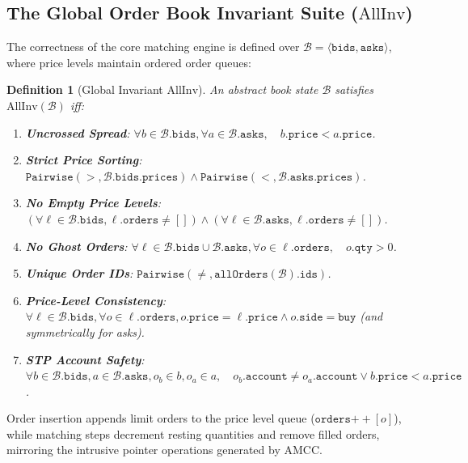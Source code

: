 \documentclass[11pt,a4paper]{article}
\newtheorem{definition}{Definition}
\begin{document}
\subsection{The Global Order Book Invariant Suite \texorpdfstring{($\mathrm{AllInv}$)}{(AllInv)}}

The correctness of the core matching engine is defined over $\mathcal{B} = \langle \mathtt{bids}, \mathtt{asks} \rangle$, where price levels maintain ordered order queues:

\begin{definition}[Global Invariant $\mathrm{AllInv}$]
An abstract book state $\mathcal{B}$ satisfies $\mathrm{AllInv}(\mathcal{B})$ iff:
\begin{enumerate}[leftmargin=*]
    \item \textbf{Uncrossed Spread}: $\forall b \in \mathcal{B}.\mathtt{bids}, \forall a \in \mathcal{B}.\mathtt{asks}, \quad b.\mathtt{price} < a.\mathtt{price}$.
    \item \textbf{Strict Price Sorting}: $\mathtt{Pairwise}(>, \mathcal{B}.\mathtt{bids}.\mathtt{prices}) \land \mathtt{Pairwise}(<, \mathcal{B}.\mathtt{asks}.\mathtt{prices})$.
    \item \textbf{No Empty Price Levels}: $(\forall \ell \in \mathcal{B}.\mathtt{bids}, \ell.\mathtt{orders} \ne []) \land (\forall \ell \in \mathcal{B}.\mathtt{asks}, \ell.\mathtt{orders} \ne [])$.
    \item \textbf{No Ghost Orders}: $\forall \ell \in \mathcal{B}.\mathtt{bids} \cup \mathcal{B}.\mathtt{asks}, \forall o \in \ell.\mathtt{orders}, \quad o.\mathtt{qty} > 0$.
    \item \textbf{Unique Order IDs}: $\mathtt{Pairwise}(\ne, \mathtt{allOrders}(\mathcal{B}).\mathtt{ids})$.
    \item \textbf{Price-Level Consistency}: $\forall \ell \in \mathcal{B}.\mathtt{bids}, \forall o \in \ell.\mathtt{orders}, o.\mathtt{price} = \ell.\mathtt{price} \land o.\mathtt{side} = \mathtt{buy}$ (and symmetrically for asks).
    \item \textbf{STP Account Safety}: $\forall b \in \mathcal{B}.\mathtt{bids}, a \in \mathcal{B}.\mathtt{asks}, o_b \in b, o_a \in a, \quad o_b.\mathtt{account} \ne o_a.\mathtt{account} \lor b.\mathtt{price} < a.\mathtt{price}$.
\end{enumerate}
\end{definition}

Order insertion appends limit orders to the price level queue ($\mathtt{orders} \mathbin{+\!+} [o]$), while matching steps decrement resting quantities and remove filled orders, mirroring the intrusive pointer operations generated by AMCC.
\end{document}
